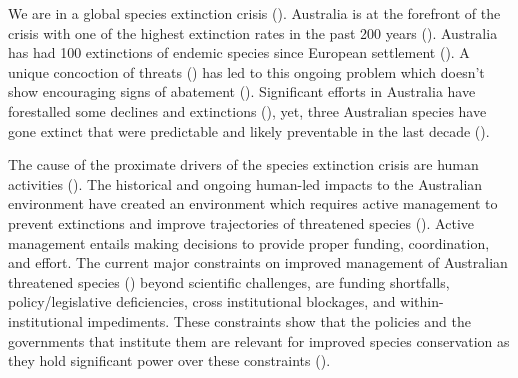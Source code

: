 \documentclass[a4paper,11pt]{article}
\begin{document}
We are in a global species extinction crisis (\cite{ceballosAcceleratedModernHuman2015,lewisDefiningAnthropocene2015,ipbesSummaryPolicymakersGlobal2019}). Australia is at the forefront of the crisis with one of the highest extinction rates in the past 200 years (\cite{woinarskiOngoingUnravelingContinental2015}). Australia has had 100 extinctions of endemic species since European settlement (\cite{woinarskiReadingBlackBook2019, commonwealthofaustraliaSpeciesProfileThreats2021}). A unique concoction of threats (\cite{kearneyThreatsAustraliaImperilled2019}) has led to this ongoing problem which doesn't show encouraging signs of abatement (\cite{simmondsVulnerableSpeciesEcosystems2020,wardLotsLossLittle2019,resideHowSendFinch2019}). Significant efforts in Australia have forestalled some declines and extinctions (\cite{kearneyThreatsAustraliaImperilled2019}), yet, three Australian species have gone extinct that were predictable and likely preventable in the last decade (\cite{woinarskiContributionPolicyLaw2017}).

The cause of the proximate drivers of the species extinction crisis are human activities (\cite{sternerPolicyDesignAnthropocene2019, maxwellBiodiversityRavagesGuns2016,brookSynergiesExtinctionDrivers2008}). The historical and ongoing human-led impacts to the Australian environment have created an environment which requires active management to prevent extinctions and improve trajectories of threatened species (\cite{kearneyThreatsAustraliaImperilled2019, allekThreatsEndangeringAustralia2018}). Active management entails making decisions to provide proper funding, coordination, and effort. The current major constraints on improved management of Australian threatened species (\cite{leggeMonitoringThreatenedSpecies2018, wintleSpendingWhatWill2019, simmondsVulnerableSpeciesEcosystems2020,kearneyThreatsAustraliaImperilled2019,woinarskiReadingBlackBook2019,wardLotsLossLittle2019}) beyond scientific challenges, are funding shortfalls, policy/legislative deficiencies, cross institutional blockages, and within-institutional impediments. These constraints show that the policies and the governments that institute them are relevant for improved species conservation as they hold significant power over these constraints (\cite{rydenLinkingDemocracyBiodiversity2020}).
\end{document}
